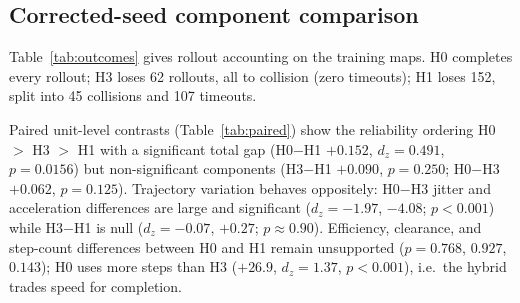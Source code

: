 \documentclass[conference]{IEEEtran}
\begin{document}
\subsection{Corrected-seed component comparison}
Table~\ref{tab:outcomes} gives rollout accounting on the training maps. H0 completes every rollout; H3 loses
62 rollouts, all to collision (zero timeouts); H1 loses 152, split into 45 collisions and 107 timeouts.
\begin{table}[t]
\centering
\caption{Corrected-seed outcomes on training maps (1000 rollouts per configuration).}
\label{tab:outcomes}
\end{table}
Paired unit-level contrasts (Table~\ref{tab:paired}) show the reliability ordering H0 $>$ H3 $>$ H1 with a
significant total gap (H0$-$H1 $+0.152$, $d_z=0.491$, $p=0.0156$) but non-significant components
(H3$-$H1 $+0.090$, $p=0.250$; H0$-$H3 $+0.062$, $p=0.125$). Trajectory variation behaves oppositely:
H0$-$H3 jitter and acceleration differences are large and significant ($d_z=-1.97$, $-4.08$; $p<0.001$) while
H3$-$H1 is null ($d_z=-0.07$, $+0.27$; $p\approx0.90$). Efficiency, clearance, and step-count differences between
H0 and H1 remain unsupported ($p=0.768$, $0.927$, $0.143$); H0 uses more steps than H3 ($+26.9$, $d_z=1.37$,
$p<0.001$), i.e.\ the hybrid trades speed for completion.
\begin{table}[t]
\centering
\caption{Paired unit-level contrasts (20 units; efficiency 19--20). Diffs are row-config minus column-config.}
\label{tab:paired}
\end{table}
\end{document}
